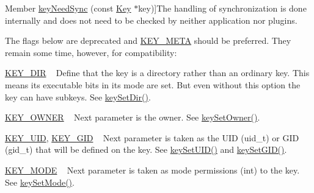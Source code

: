 \begin{DoxyRefList}
%
Member \hyperlink{group__keytest_gaf247df0de7aca04b32ef80e39ef12950}{key\+Need\+Sync} (const \hyperlink{classkdb_1_1Key}{Key} $\ast$key)]The handling of synchronization is done internally and does not need to be checked by neither application nor plugins. 
\item[\label{deprecated__deprecated000010}%
\Hypertarget{deprecated__deprecated000010}%
Member \hyperlink{group__key_gad23c65b44bf48d773759e1f9a4d43b89}{key\+New} (const char $\ast$name,...)]The flags below are deprecated and \hyperlink{group__key_gga9b703ca49f48b482def322b77d3e6bc8a040582834bb2d90049947d7ef74e87e2}{K\+E\+Y\+\_\+\+M\+E\+TA} should be preferred. They remain some time, however, for compatibility\+:
\begin{DoxyItemize}
\item \hyperlink{group__key_gga9b703ca49f48b482def322b77d3e6bc8a9e43e47c8a21478538e2d20e049981d5}{K\+E\+Y\+\_\+\+D\+IR} ~\newline
 Define that the key is a directory rather than an ordinary key. This means its executable bits in its mode are set. But even without this option the key can have subkeys. See \hyperlink{group__meta_gaae575bd86a628a15ee45baa860522e75}{key\+Set\+Dir()}.
\item \hyperlink{group__key_gga9b703ca49f48b482def322b77d3e6bc8a77ca60362fa8daca8d5347db4385068b}{K\+E\+Y\+\_\+\+O\+W\+N\+ER} ~\newline
 Next parameter is the owner. See \hyperlink{owner_8c_a88d6ec200ba0707b7c1b4a88133d2be4}{key\+Set\+Owner()}.
\item \hyperlink{group__key_gga9b703ca49f48b482def322b77d3e6bc8a28f01a87d65f065172f734c9c9446c0e}{K\+E\+Y\+\_\+\+U\+ID}, \hyperlink{group__key_gga9b703ca49f48b482def322b77d3e6bc8ac0628bbaba7c837ca73323681393d15f}{K\+E\+Y\+\_\+\+G\+ID} ~\newline
 Next parameter is taken as the U\+ID (uid\+\_\+t) or G\+ID (gid\+\_\+t) that will be defined on the key. See \hyperlink{group__meta_gab5f284f5ecd261e0a290095f50ba1af7}{key\+Set\+U\+I\+D()} and \hyperlink{group__meta_ga9e3d0fb3f7ba906e067727b9155d22e3}{key\+Set\+G\+I\+D()}.
\item \hyperlink{group__key_gga9b703ca49f48b482def322b77d3e6bc8a1b0a91ff3a855d6993930ebf0abaa518}{K\+E\+Y\+\_\+\+M\+O\+DE} ~\newline
 Next parameter is taken as mode permissions (int) to the key. See \hyperlink{group__meta_ga8803037e35b9da1ce492323a88ff6bc3}{key\+Set\+Mode()}. 
\begin{DoxyCodeInclude}

\end{DoxyCodeInclude}
\end{DoxyItemize}
\end{DoxyRefList}
